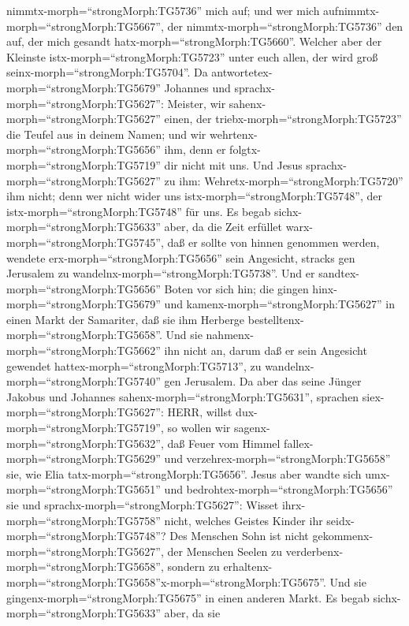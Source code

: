 nimmtx-morph=``strongMorph:TG5736'' mich auf; und wer mich
aufnimmtx-morph=``strongMorph:TG5667'', der
nimmtx-morph=``strongMorph:TG5736'' den auf, der mich gesandt
hatx-morph=``strongMorph:TG5660''. Welcher aber der Kleinste
istx-morph=``strongMorph:TG5723'' unter euch allen, der wird groß
seinx-morph=``strongMorph:TG5704''.  Da
antwortetex-morph=``strongMorph:TG5679'' Johannes und
sprachx-morph=``strongMorph:TG5627'': Meister, wir
sahenx-morph=``strongMorph:TG5627'' einen, der
triebx-morph=``strongMorph:TG5723'' die Teufel aus in deinem Namen; und
wir wehrtenx-morph=``strongMorph:TG5656'' ihm, denn er
folgtx-morph=``strongMorph:TG5719'' dir nicht mit uns.  Und
Jesus sprachx-morph=``strongMorph:TG5627'' zu ihm:
Wehretx-morph=``strongMorph:TG5720'' ihm nicht; denn wer nicht wider uns
istx-morph=``strongMorph:TG5748'', der istx-morph=``strongMorph:TG5748''
für uns.  Es begab sichx-morph=``strongMorph:TG5633'' aber,
da die Zeit erfüllet warx-morph=``strongMorph:TG5745'', daß er sollte
von hinnen genommen werden, wendete erx-morph=``strongMorph:TG5656''
sein Angesicht, stracks gen Jerusalem zu
wandelnx-morph=``strongMorph:TG5738''.  Und er
sandtex-morph=``strongMorph:TG5656'' Boten vor sich hin; die gingen
hinx-morph=``strongMorph:TG5679'' und
kamenx-morph=``strongMorph:TG5627'' in einen Markt der Samariter, daß
sie ihm Herberge bestelltenx-morph=``strongMorph:TG5658''. 
Und sie nahmenx-morph=``strongMorph:TG5662'' ihn nicht an, darum daß er
sein Angesicht gewendet hattex-morph=``strongMorph:TG5713'', zu
wandelnx-morph=``strongMorph:TG5740'' gen Jerusalem.  Da
aber das seine Jünger Jakobus und Johannes
sahenx-morph=``strongMorph:TG5631'', sprachen
siex-morph=``strongMorph:TG5627'': HERR, willst
dux-morph=``strongMorph:TG5719'', so wollen wir
sagenx-morph=``strongMorph:TG5632'', daß Feuer vom Himmel
fallex-morph=``strongMorph:TG5629'' und
verzehrex-morph=``strongMorph:TG5658'' sie, wie Elia
tatx-morph=``strongMorph:TG5656''.  Jesus aber wandte sich
umx-morph=``strongMorph:TG5651'' und
bedrohtex-morph=``strongMorph:TG5656'' sie und
sprachx-morph=``strongMorph:TG5627'': Wisset
ihrx-morph=``strongMorph:TG5758'' nicht, welches Geistes Kinder ihr
seidx-morph=``strongMorph:TG5748''?  Des Menschen Sohn ist
nicht gekommenx-morph=``strongMorph:TG5627'', der Menschen Seelen zu
verderbenx-morph=``strongMorph:TG5658'', sondern zu
erhaltenx-morph=``strongMorph:TG5658''x-morph=``strongMorph:TG5675''.
 Und sie gingenx-morph=``strongMorph:TG5675'' in einen
anderen Markt. Es begab sichx-morph=``strongMorph:TG5633'' aber, da sie
